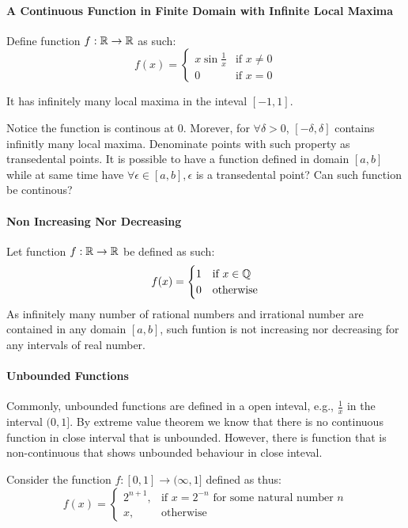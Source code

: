 \documentclass[../note.tex]{subfiles}
\begin{document}
\paragraph{A Continuous Function in Finite Domain with Infinite Local Maxima} \label{InfiniteLocalMaxima}
Define function $f:\mathbb{R}\rightarrow \mathbb{R}$ as such:
\[
	f(x)=
	\begin{cases}
		x\sin{\frac{1}{x}} & \text{if } x\neq 0\\
		0 & \text{if } x = 0
	\end{cases}
\]

It has infinitely many local maxima in the inteval $[-1,1]$.

Notice the function is continous at $0$. Morever, for $\forall \delta > 0$, $[-\delta, \delta]$ contains infinitly many local maxima. Denominate points with such property as transedental points. It is possible to have a function defined in domain $[a,b]$ while at same time have $\forall \epsilon \in [a,b], \epsilon$ is a transedental point? Can such function be continous? 
\paragraph{Non Increasing Nor Decreasing}
Let function $f: \mathbb{R}\rightarrow \mathbb{R}$ be defined as such:
\[
	f(x)=
	\begin{cases}
		1 &\text{if } x \in \mathbb{Q}\\
		0 &\text{otherwise}
	\end{cases}
\]
As infinitely many number of rational numbers and irrational number are contained in any domain $[a,b]$, such funtion is not increasing nor decreasing for any intervals of real number.

\paragraph{Unbounded Functions}
Commonly, unbounded functions are defined in a open inteval, e.g., $\frac{1}{x}$ in the interval $(0, 1]$. By extreme value theorem we know that there is no continuous function in close interval that is unbounded. However, there is function that is non-continuous that shows unbounded behaviour in close inteval.

Consider the function $f:[0,1] \rightarrow (\infty, 1]$ defined as thus:
\[
    f(x)= 
\begin{cases}
	2^{n+1},& \text{if } x=2^{-n} \text{ for some natural number }n\\
    x,              & \text{otherwise}
\end{cases}
\]
\end{document}
